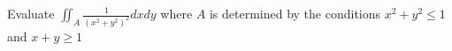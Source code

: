 Evaluate $\iint_A \frac{1}{\left(x^2+y^2\right)^2} d x d y$ where $A$ is determined by the conditions $x^2+y^2 \leq 1$ and $x+y \geq 1$

